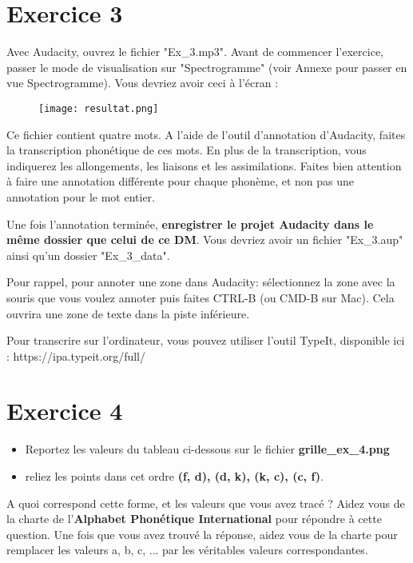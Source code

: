 \documentclass[french]{article}
\begin{document}
\newpage
\section{Exercice 3}

Avec Audacity, ouvrez le fichier "Ex\_3.mp3". Avant de commencer l'exercice, passer le mode de visualisation sur "Spectrogramme" (voir Annexe pour passer en vue Spectrogramme). Vous devriez avoir ceci à l'écran : 

\begin{figure}[h!]
	\texttt{[image: resultat.png]}

\end{figure}


Ce fichier contient quatre mots. A l'aide de l'outil d'annotation d'Audacity, faites la transcription phonétique de ces mots. En plus de la transcription, vous indiquerez les allongements, les liaisons et les assimilations. Faites bien attention à faire une annotation différente pour chaque phonème, et non pas une annotation pour le mot entier. 

Une fois l'annotation terminée, \textbf{enregistrer le projet Audacity dans le même dossier que celui de ce DM}. Vous devriez avoir un fichier "Ex\_3.aup" ainsi qu'un dossier "Ex\_3\_data".


Pour rappel, pour annoter une zone dans Audacity: sélectionnez la zone avec la souris que vous voulez annoter puis faites CTRL-B (ou CMD-B sur Mac). Cela ouvrira une zone de texte dans la piste inférieure. 

Pour transcrire sur l'ordinateur, vous pouvez utiliser l'outil TypeIt, disponible ici : https://ipa.typeit.org/full/

\newpage
\section{Exercice 4}

\begin{itemize}
	\item Reportez les valeurs du tableau ci-dessous sur le fichier \textbf{grille\_ex\_4.png}
	\item reliez les points dans cet ordre \textbf{(f, d), (d, k), (k, c), (c, f)}.
\end{itemize}


 A quoi correspond cette forme, et les valeurs que vous avez tracé ? Aidez vous de la charte de l'\textbf{Alphabet Phonétique International} pour répondre à cette question. Une fois que vous avez trouvé la réponse, aidez vous de la charte pour remplacer les valeurs a, b, c, ... par les véritables valeurs correspondantes.
\end{document}
